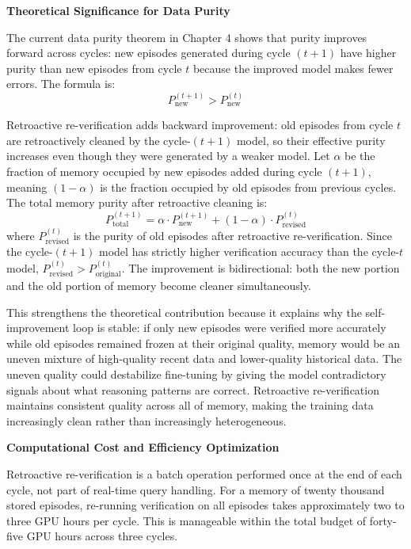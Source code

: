 \documentclass[11pt,a4paper]{article}
\begin{document}
{\textbf{Theoretical Significance for Data Purity}

The current data purity theorem in Chapter 4 shows that purity improves forward across cycles: new episodes generated during cycle $(t+1)$ have higher purity than new episodes from cycle $t$ because the improved model makes fewer errors. The formula is:
\[
P_{\text{new}}^{(t+1)} > P_{\text{new}}^{(t)}
\]

Retroactive re-verification adds backward improvement: old episodes from cycle $t$ are retroactively cleaned by the cycle-$(t+1)$ model, so their effective purity increases even though they were generated by a weaker model. Let $\alpha$ be the fraction of memory occupied by new episodes added during cycle $(t+1)$, meaning $(1-\alpha)$ is the fraction occupied by old episodes from previous cycles. The total memory purity after retroactive cleaning is:
\[
P_{\text{total}}^{(t+1)} = \alpha \cdot P_{\text{new}}^{(t+1)} + (1-\alpha) \cdot P_{\text{revised}}^{(t)}
\]
where $P_{\text{revised}}^{(t)}$ is the purity of old episodes after retroactive re-verification. Since the cycle-$(t+1)$ model has strictly higher verification accuracy than the cycle-$t$ model, $P_{\text{revised}}^{(t)} > P_{\text{original}}^{(t)}$. The improvement is bidirectional: both the new portion and the old portion of memory become cleaner simultaneously.

This strengthens the theoretical contribution because it explains why the self-improvement loop is stable: if only new episodes were verified more accurately while old episodes remained frozen at their original quality, memory would be an uneven mixture of high-quality recent data and lower-quality historical data. The uneven quality could destabilize fine-tuning by giving the model contradictory signals about what reasoning patterns are correct. Retroactive re-verification maintains consistent quality across all of memory, making the training data increasingly clean rather than increasingly heterogeneous.

\textbf{Computational Cost and Efficiency Optimization}

Retroactive re-verification is a batch operation performed once at the end of each cycle, not part of real-time query handling. For a memory of twenty thousand stored episodes, re-running verification on all episodes takes approximately two to three GPU hours per cycle. This is manageable within the total budget of forty-five GPU hours across three cycles. 

}
\end{document}

